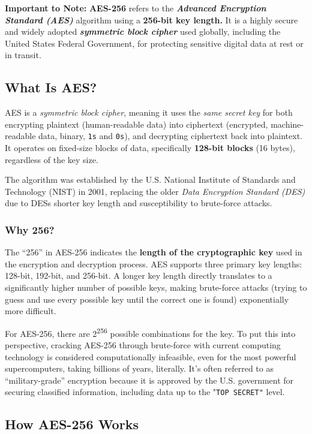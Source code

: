 \textbf{Important to Note:}
\textbf{AES-256} refers to the \textit{\textbf{Advanced Encryption Standard (AES)}} algorithm using a \textbf{256-bit key length. }It is a highly secure and widely adopted \textit{\textbf{symmetric block cipher}} used globally, including the United States Federal Government, for protecting sensitive digital data at rest or in transit.

\subsection{\textbf{What Is AES?}}

AES is a \textit{symmetric block cipher}, meaning it uses the \textit{same secret key} for both encrypting plaintext (human-readable data) into ciphertext (encrypted, machine-readable data, binary, \texttt{1s} and \texttt{0s}), and decrypting ciphertext back into plaintext. It operates on fixed-size blocks of data, specifically \textbf{128-bit blocks} (16 bytes), regardless of the key size.

The algorithm was established by the U.S. National Institute of Standards and Technology (NIST) in 2001, replacing the older \textit{Data Encryption Standard (DES)} due to DESs shorter key length and susceptibility to brute-force attacks.

\subsubsection{\textbf{Why 256?}}
The “256” in AES-256 indicates the \textbf{length of the cryptographic key} used in the encryption and decryption process. AES supports three primary key lengths: 128-bit, 192-bit, and 256-bit. A longer key length directly translates to a significantly higher number of possible keys, making brute-force attacks (trying to guess and use every possible key until the correct one is found) exponentially more difficult.

For AES-256, there are 2\textsuperscript{256} possible combinations for the key. To put this into perspective, cracking AES-256 through brute-force with current computing technology is considered computationally infeasible, even for the most powerful supercomputers, taking billions of years, literally. It’s often referred to as “military-grade” encryption because it is approved by the U.S. government for securing classified information, including data up to the "\texttt{TOP SECRET"} level.

\subsection{\textbf{How AES-256 Works}}

